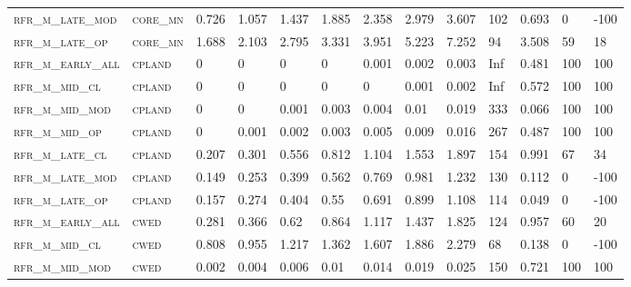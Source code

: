 \begin{landscape}
\begin{center}
\begin{footnotesize}
\begin{longtable}{lllllllllllll}
\textsc{rfr\_m\_late\_mod } & \textsc{core\_mn  }   & 0.726   & 1.057   & 1.437    & 1.885    & 2.358    & 2.979    & 3.607    & 102    & 0.693         & 0             & -100     \\
\textsc{rfr\_m\_late\_op  } & \textsc{core\_mn  }   & 1.688   & 2.103   & 2.795    & 3.331    & 3.951    & 5.223    & 7.252    & 94     & 3.508         & 59            & 18       \\
\textsc{rfr\_m\_early\_all} & \textsc{cpland    }   & 0       & 0       & 0        & 0        & 0.001    & 0.002    & 0.003    & Inf    & 0.481         & 100           & 100      \\
\textsc{rfr\_m\_mid\_cl   } & \textsc{cpland    }   & 0       & 0       & 0        & 0        & 0        & 0.001    & 0.002    & Inf    & 0.572         & 100           & 100      \\
\textsc{rfr\_m\_mid\_mod  } & \textsc{cpland    }   & 0       & 0       & 0.001    & 0.003    & 0.004    & 0.01     & 0.019    & 333    & 0.066         & 100           & 100      \\
\textsc{rfr\_m\_mid\_op   } & \textsc{cpland    }   & 0       & 0.001   & 0.002    & 0.003    & 0.005    & 0.009    & 0.016    & 267    & 0.487         & 100           & 100      \\
\textsc{rfr\_m\_late\_cl  } & \textsc{cpland    }   & 0.207   & 0.301   & 0.556    & 0.812    & 1.104    & 1.553    & 1.897    & 154    & 0.991         & 67            & 34       \\
\textsc{rfr\_m\_late\_mod } & \textsc{cpland    }   & 0.149   & 0.253   & 0.399    & 0.562    & 0.769    & 0.981    & 1.232    & 130    & 0.112         & 0             & -100     \\
\textsc{rfr\_m\_late\_op  } & \textsc{cpland    }   & 0.157   & 0.274   & 0.404    & 0.55     & 0.691    & 0.899    & 1.108    & 114    & 0.049         & 0             & -100     \\
\textsc{rfr\_m\_early\_all} & \textsc{cwed      }   & 0.281   & 0.366   & 0.62     & 0.864    & 1.117    & 1.437    & 1.825    & 124    & 0.957         & 60            & 20       \\
\textsc{rfr\_m\_mid\_cl   } & \textsc{cwed      }   & 0.808   & 0.955   & 1.217    & 1.362    & 1.607    & 1.886    & 2.279    & 68     & 0.138         & 0             & -100     \\
\textsc{rfr\_m\_mid\_mod  } & \textsc{cwed      }   & 0.002   & 0.004   & 0.006    & 0.01     & 0.014    & 0.019    & 0.025    & 150    & 0.721         & 100           & 100      \\

\end{longtable}
\end{footnotesize}
\end{center}
\end{landscape}

